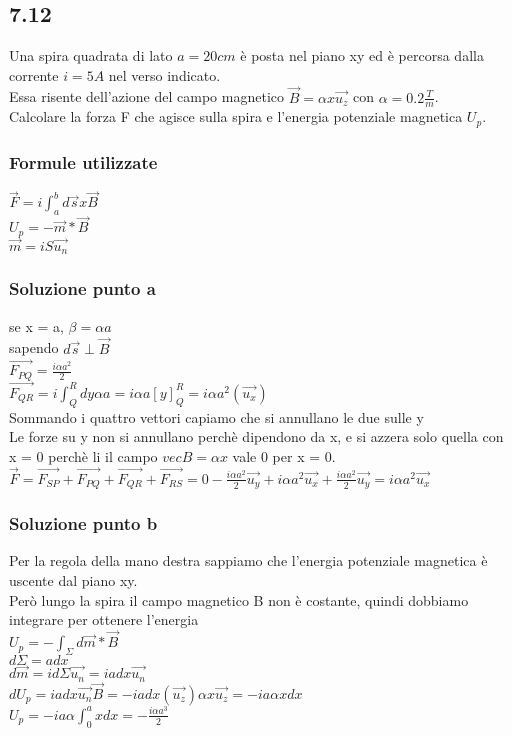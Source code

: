\documentclass[../../main.tex]{subfiles}
\begin{document}
\subsection*{7.12}
Una spira quadrata di lato $a=20cm$ è posta nel piano xy ed è percorsa dalla corrente $i = 5A$ nel verso indicato.
\\Essa risente dell'azione del campo magnetico $\vec{B} = \alpha x \vec{u_z}$ con $\alpha = 0.2 \frac{T}{m}$.
\\Calcolare la forza F che agisce sulla spira e l'energia potenziale magnetica $U_p$.
\subsubsection*{Formule utilizzate}
$\vec{F} = i\int_a^bd\vec{s}x\vec{B}$
\\$U_p = -\vec{m} * \vec{B}$
\\$ \vec{m} = i S \vec{u_n}$
\subsubsection*{Soluzione punto a}
se x = a, $\beta = \alpha a$
\\sapendo $d\vec{s}\perp \vec{B}$
\\$\vec{F_{PQ}} = \frac{i\alpha a^2}{2}$
\\$\vec{F_{QR}} = i\int_Q^Rdy\alpha a = i\alpha a[y]_Q^R = i \alpha a^2 (\vec{u_x})$
\\Sommando i quattro vettori capiamo che si annullano le due sulle y
\\Le forze su y non si annullano perchè dipendono da x, e si azzera solo quella con x = 0 perchè li il campo $  vec{B} = \alpha x $ vale 0 per x = 0.
\\$\vec{F} = \vec{F_{SP}} + \vec{F_{PQ}} + \vec{F_{QR}} + \vec{F_{RS}} = 0 - \frac{i\alpha a^2}{2}\vec{u_y} + i\alpha a^2\vec{u_x} + \frac{i\alpha a^2}{2}\vec{u_y} = i \alpha a^2 \vec{u_x}$
\subsubsection*{Soluzione punto b}
Per la regola della mano destra sappiamo che l'energia potenziale magnetica è uscente dal piano xy.
\\Però lungo la spira il campo magnetico B non è costante, quindi dobbiamo integrare per ottenere l'energia
\\$U_p = -\int_\Sigma d\vec{m} * \vec{B}$
\\$d\Sigma = adx$
\\$d\vec{m} = id\Sigma\vec{u_n} = i a dx \vec{u_n}$
\\$dU_p = iadx\vec{u_n}\vec{B} = -iadx(\vec{u_z})\alpha x \vec{u_z} = -ia\alpha x dx$
\\$U_p = -ia\alpha \int_0^axdx = -\frac{i\alpha a^3}{2}$
\newpage
\end{document}
